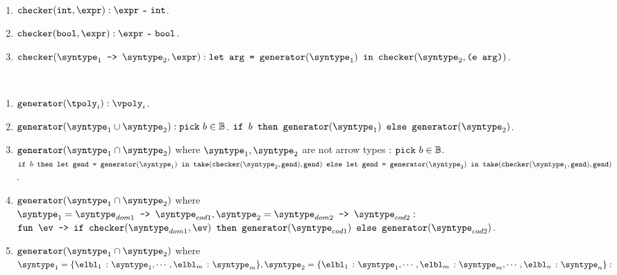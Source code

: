 \begin{definition}
  \label{def_CheCore}
  \ \par 
  \begin{enumerate}
    \item $\mkche{\tint}{\expr} : \matches{\expr}{\tint}$.
    \item $\mkche{\tbool}{\expr} : \matches{\expr}{\tbool}$.
    \item $\mkche{\mkfun{\syntype_1}{\syntype_2}}{\expr} : \texttt{let arg = }\mkgen{\syntype_1} \texttt{ in }\mkche{\syntype_2}{\texttt{(e arg)}}$.
  \end{enumerate}
\end{definition}

\begin{definition}
  \label{def_genExt}
  \ \par 
  \begin{enumerate}
    \item $\mkgen{\tpoly_i} : \vpoly_i$.
    \item $\mkgen{\mkunion{\syntype_1}{\syntype_2}} : \pick \ b \in \mathbb{B}$. $\ife{b}{\mkgen{\syntype_1}}{\mkgen{\syntype_2}}$.
    \item $\mkgen{\mkintersect{\syntype_1}{\syntype_2}}$ where $\syntype_1, \syntype_2$ are not arrow types : $\texttt{pick} \ b \in \mathbb{B}$. \\ 
    $\ife{b}{\texttt{let gend = } \mkgen{\syntype_1} \texttt{ in }\take{\mkche{\syntype_2}{\texttt{gend}}}{\texttt{gend}}
    }{\\ \texttt{let gend = } \mkgen{\syntype_2} \texttt{ in }\take{\mkche{\syntype_1}{\texttt{gend}}}{\texttt{gend}}
    }$.
    \item $\mkgen{\mkintersect{\syntype_1}{\syntype_2}}$ where $\syntype_1 = \mkfun{\syntype_{dom1}}{\syntype_{cod1}}, \syntype_2 = \mkfun{\syntype_{dom2}}{\syntype_{cod2}} : $ \\ 
    $\mkfunv{\ev}{
      \ife{\mkche{\syntype_{dom1}}{\ev}}{\mkgen{\syntype_{cod1}}}{\\\mkgen{\syntype_{cod2}}}
    }$. 
    \item $\mkgen{\mkintersect{\syntype_1}{\syntype_2}}$ where \\ $\syntype_1 = \{\hastype{\elbl_1}{\syntype_1}, \cdots, \hastype{\elbl_m}{\syntype_m}\}, \syntype_2 = \{\hastype{\elbl_1}{\syntype_1}, \cdots, \hastype{\elbl_m}{\syntype_m}, \cdots, \hastype{\elbl_n}{\syntype_n}\} : $ \\ 

\end{enumerate}
\end{definition}
